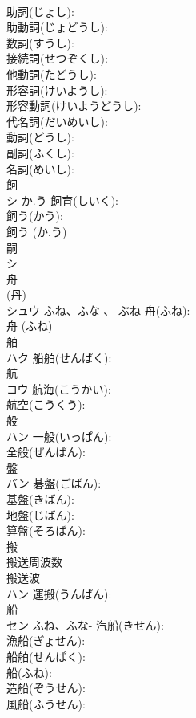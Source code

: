 \documentclass[8pt]{extreport}
\begin{document}
\begin{CJK}{UTF8}{min}
\\	助詞(じょし): 
\\	助動詞(じょどうし): 
\\	数詞(すうし): 
\\	接続詞(せつぞくし): 
\\	他動詞(たどうし): 
\\	形容詞(けいようし): 
\\	形容動詞(けいようどうし): 
\\	代名詞(だいめいし): 
\\	動詞(どうし): 
\\	副詞(ふくし): 
\\	名詞(めいし): 
\\	飼			
\\	シ	か.う	飼育(しいく): 
\\	飼う(かう): 
\\	飼う (か.う)
\\	嗣			
\\	シ			
\\	舟			
\\	(丹) 
\\	シュウ	ふね、ふな-、-ぶね	舟(ふね): 
\\	舟 (ふね)
\\	舶			
\\	ハク		船舶(せんぱく): 
\\	航			
\\	コウ		航海(こうかい): 
\\	航空(こうくう): 
\\	般			
\\	ハン		一般(いっぱん): 
\\	全般(ぜんぱん): 
\\	盤			
\\	バン		碁盤(ごばん): 
\\	基盤(きばん): 
\\	地盤(じばん): 
\\	算盤(そろばん): 
\\	搬			
\\	搬送周波数 
\\	搬送波 
\\	ハン		運搬(うんぱん): 
\\	船			
\\	セン	ふね、ふな-	汽船(きせん): 
\\	漁船(ぎょせん): 
\\	船舶(せんぱく): 
\\	船(ふね): 
\\	造船(ぞうせん): 
\\	風船(ふうせん): 

\end{CJK}
\end{document}
